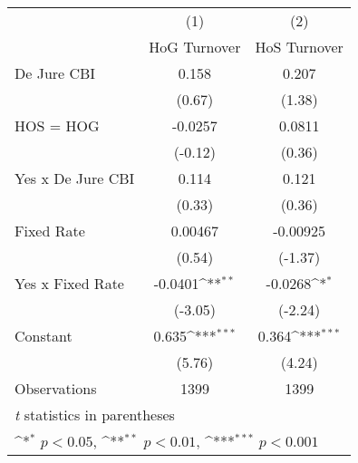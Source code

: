 \begin{table}[htbp]\centering
\def\sym#1{\ifmmode^{#1}\else\(^{#1}\)\fi}
\caption{\label{hoshogmultIndFEDJ}}
\begin{tabular}{l*{2}{c}}
\toprule
                                        &\multicolumn{1}{c}{(1)}&\multicolumn{1}{c}{(2)}\\
                                        &\multicolumn{1}{c}{HoG Turnover}&\multicolumn{1}{c}{HoS Turnover}\\
\midrule
De Jure CBI                             &    0.158         &    0.207         \\
                                        &   (0.67)         &   (1.38)         \\
\addlinespace
HOS = HOG                               &  -0.0257         &   0.0811         \\
                                        &  (-0.12)         &   (0.36)         \\
\addlinespace
Yes x De Jure CBI                       &    0.114         &    0.121         \\
                                        &   (0.33)         &   (0.36)         \\
\addlinespace
Fixed Rate                              &  0.00467         & -0.00925         \\
                                        &   (0.54)         &  (-1.37)         \\
\addlinespace
Yes x Fixed Rate                        &  -0.0401\sym{**} &  -0.0268\sym{*}  \\
                                        &  (-3.05)         &  (-2.24)         \\
\addlinespace
Constant                                &    0.635\sym{***}&    0.364\sym{***}\\
                                        &   (5.76)         &   (4.24)         \\
\midrule
Observations                            &     1399         &     1399         \\
\bottomrule
\multicolumn{3}{l}{\footnotesize \textit{t} statistics in parentheses}\\
\multicolumn{3}{l}{\footnotesize \sym{*} \(p<0.05\), \sym{**} \(p<0.01\), \sym{***} \(p<0.001\)}\\
\end{tabular}
\end{table}

